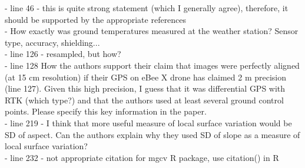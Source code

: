 \documentclass[12pt,english]{reviewresponse}
\begin{document}
\begin{revcomment}
- line 46 - this is quite strong statement (which I generally agree), therefore, it should be supported by the appropriate references\\
- How exactly was ground temperatures measured at the weather station? Sensor type, accuracy, shielding...\\
- line 126 - resampled, but how?\\
- line 128 How the authors support their claim that images were perfectly aligned (at 15 cm resolution) if their GPS on eBee X drone has claimed 2 m precision (line 127). Given this high precision, I guess that it was differential GPS with RTK (which type?) and that the authors used at least several ground control points. Please specify this key information in the paper.\\
- line 219 - I think that more useful measure of local surface variation would be SD of aspect. Can the authors explain why they used SD of slope as a measure of local surface variation?\\
- line 232 - not appropriate citation for mgcv R package, use citation() in R
\end{revcomment}
\end{document}
